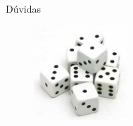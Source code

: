 \documentclass[aspectratio=169]{beamer}
\begin{document}

\begin{frame}
\Huge{\centerline{Dúvidas}}

\begin{figure}[!h]
  \centering
  \includegraphics[width=100pt]{imgs/dados.jpg}
  \label{fig_fim}
\end{figure}
\end{frame}
\end{document}
